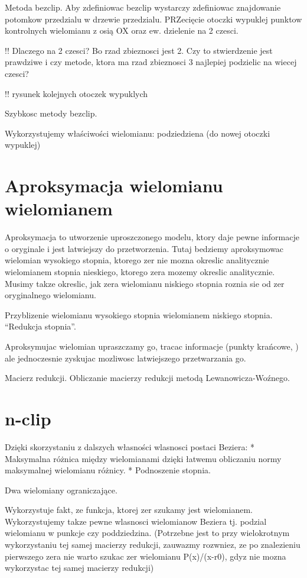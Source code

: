 \documentclass[11pt,a4paper,oneside]{report}
\begin{document}
Metoda bezclip. Aby zdefiniowac bezclip wystarczy zdefiniowac znajdowanie potomkow przedzialu w drzewie przedzialu. PRZecięcie otoczki wypuklej punktow kontrolnych wielomianu z osią OX oraz ew. dzielenie na 2 czesci.

!! Dlaczego na 2 czesci? Bo rzad zbieznosci jest 2. Czy to stwierdzenie jest prawdziwe i czy metode, ktora ma rzad zbieznosci 3 najlepiej podzielic na wiecej czesci?

!! rysunek kolejnych otoczek wypuklych

Szybkosc metody bezclip.

Wykorzystujemy właściwości wielomianu: podziedziena (do nowej otoczki wypuklej)

\section{Aproksymacja wielomianu wielomianem}

Aproksymacja to utworzenie uproszczonego modelu, ktory daje pewne informacje o oryginale i jest latwiejszy do przetworzenia. Tutaj bedziemy aproksymowac wielomian wysokiego stopnia, ktorego zer nie mozna okreslic analitycznie wielomianem stopnia nieskiego, ktorego zera mozemy okreslic analitycznie. Musimy takze okreslic, jak zera wielomianu niskiego stopnia roznia sie od zer oryginalnego wielomianu.

Przyblizenie wielomianu wysokiego stopnia wielomianem niskiego stopnia. ``Redukcja stopnia''. 

Aproksymujac wielomian upraszczamy go, tracac informacje (punkty krańcowe, ) ale jednoczesnie zyskujac mozliwosc latwiejszego przetwarzania go.

Macierz redukcji. Obliczanie macierzy redukcji metodą Lewanowicza-Woźnego.

\section{n-clip}

Dzięki skorzystaniu z dalszych własności wlasnosci postaci Beziera: 
* Maksymalna różnica między wielomianami dzięki łatwemu obliczaniu normy maksymalnej wielomianu różnicy.
* Podnoszenie stopnia.

Dwa wielomiany ograniczające.

Wykorzystuje fakt, ze funkcja, ktorej zer szukamy jest wielomianem. Wykorzystujemy takze pewne wlasnosci wielomianow Beziera tj. podzial wielomianu w punkcje czy poddziedzina. (Potrzebne jest to przy wielokrotnym wykorzystaniu tej samej macierzy redukcji, zauwazmy rozwniez, ze po znalezieniu pierwszego zera nie warto szukac zer wielomianu P(x)/(x-r0), gdyz nie mozna wykorzystac tej samej macierzy redukcji)
\end{document}
